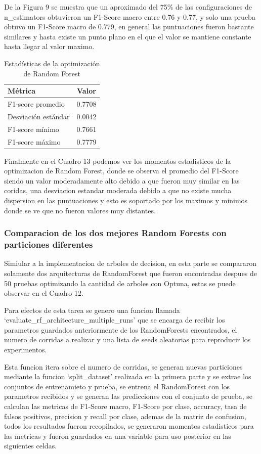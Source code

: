 \documentclass[12pt,a4paper]{article}
\begin{document}
De la Figura 9 se muestra que un aproximado del 75\% de las configuraciones de n_estimators
obtuvieron un F1-Score macro entre 0.76 y 0.77, y solo una prueba obtuvo un F1-Score macro de 0.779, en general
las puntuaciones fueron bastante similares y hasta existe un punto plano en el que el valor se mantiene constante
hasta llegar al valor maximo.

\begin{table}[H]
  \centering
  \begin{tabular}{lc}
    \hline
    Métrica & Valor \\
    \hline
    F1-score promedio & 0.7708 \\
    Desviación estándar & 0.0042 \\
    F1-score mínimo & 0.7661 \\
    F1-score máximo & 0.7779 \\
    \hline
  \end{tabular}
  \caption{Estadísticas de la optimización de Random Forest}
  \label{tab:rf-opt-stats}
\end{table}

Finalmente en el Cuadro 13 podemos ver los momentos estadisticos de la optimizacion de Random Forest,
donde se observa el promedio del F1-Score siendo un valor moderadamente alto debido a que fueron muy similar en las coridas,
una desviacion estandar moderada debido a que no existe mucha dispersion en las puntuaciones y esto es soportado
por los maximos y minimos donde se ve que no fueron valores muy distantes.

\subsubsection{Comparacion de los dos mejores Random Forests con particiones diferentes}

Simiular a la implementacion de arboles de decision, en esta parte se compararon solamente dos arquitecturas de
RandomForest que fueron encontradas despues de 50 pruebas optimizando la cantidad de arboles con Optuna, estas se
puede observar en el Cuadro 12.

Para efectos de esta tarea se genero una funcion llamada `evaluate_rf_architecture_multiple_runs' que se encarga de recibir
los parametros guardados anteriormente de los RandomForests encontrados, el numero de corridas a realizar y una lista de seeds aleatorias
para reproducir los experimentos.

Esta funcion itera sobre el numero de corridas, se generan nuevas particiones mediante la funcion `split_dataset' realizada en la
primera parte y se extrae los conjuntos de entrenamieto y prueba, se entrena el RandomForest con los parametros recibidos
y se generan las predicciones con el conjunto de prueba, se calculan las metricas de F1-Score macro, F1-Score por clase, accuracy, tasa de
falsos positivos, precision y recall por clase, ademas de la matriz de confusion, todos los resultados fueron recopilados,
se generaron momentos estadisticos para las metricas y fueron guardados en una variable para uso posterior en las siguientes celdas.
\end{document}
